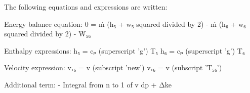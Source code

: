 The following equations and expressions are written:  

Energy balance equation:  
0 = ṁ (h₅ + w₅ squared divided by 2) - ṁ (h₆ + w₆ squared divided by 2) - Ẇ₅₆  

Enthalpy expressions:  
h₅ = cₚ (superscript 'g') T₅  
h₆ = cₚ (superscript 'g') T₆  

Velocity expression:  
v₊₆ = v (subscript 'new')  
v₊₆ = v (subscript 'T₅₆')  

Additional term:  
- Integral from n to 1 of v dp + Δke